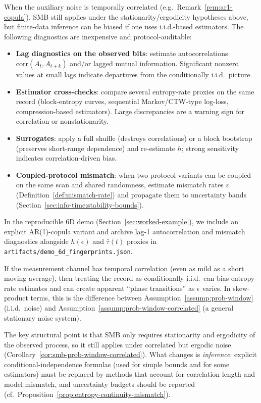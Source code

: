 \begin{remark}\label{rem:correlated-diagnostics}
When the auxiliary noise is temporally correlated (e.g.\ Remark~\ref{rem:ar1-copula}), SMB still applies under the stationarity/ergodicity hypotheses above, but finite-data inference can be biased if one uses i.i.d.-based estimators. The following diagnostics are inexpensive and protocol-auditable:
\begin{itemize}[leftmargin=*,itemsep=2pt]
  \item \textbf{Lag diagnostics on the observed bits}: estimate autocorrelations $\mathrm{corr}(A_t,A_{t+k})$ and/or lagged mutual information. Significant nonzero values at small lags indicate departures from the conditionally i.i.d.\ picture.
  \item \textbf{Estimator cross-checks}: compare several entropy-rate proxies on the same record (block-entropy curves, sequential Markov/CTW-type log-loss, compression-based estimators). Large discrepancies are a warning sign for correlation or nonstationarity.
  \item \textbf{Surrogates}: apply a full shuffle (destroys correlations) or a block bootstrap (preserves short-range dependence) and re-estimate $h$; strong sensitivity indicates correlation-driven bias.
  \item \textbf{Coupled-protocol mismatch}: when two protocol variants can be coupled on the same scan and shared randomness, estimate mismatch rates $\varepsilon$ (Definition~\ref{def:mismatch-rate}) and propagate them to uncertainty bands (Section~\ref{sec:info-time:stability-bounds}).
\end{itemize}
In the reproducible 6D demo (Section~\ref{sec:worked-example}), we include an explicit AR(1)-copula variant and archive lag-1 autocorrelation and mismatch diagnostics alongside $h(\epsilon)$ and $\widehat\tau(t)$ proxies in \texttt{artifacts/demo\_6d\_fingerprints.json}.
\end{remark}

\begin{remark}\label{rem:correlation-can-fake-jumps}
If the measurement channel has temporal correlation (even as mild as a short moving average), then treating the record as conditionally i.i.d.\ can bias entropy-rate estimates and can create apparent ``phase transitions'' as $\epsilon$ varies. In skew-product terms, this is the difference between Assumption~\ref{assump:prob-window} (i.i.d.\ noise) and Assumption~\ref{assump:prob-window-correlated} (a general stationary noise system).

The key structural point is that SMB only requires stationarity and ergodicity of the observed process, so it still applies under correlated but ergodic noise (Corollary~\ref{cor:smb-prob-window-correlated}). What changes is \emph{inference}: explicit conditional-independence formulas (used for simple bounds and for some estimators) must be replaced by methods that account for correlation length and model mismatch, and uncertainty budgets should be reported (cf.\ Proposition~\ref{prop:entropy-continuity-mismatch}).
\end{remark}


